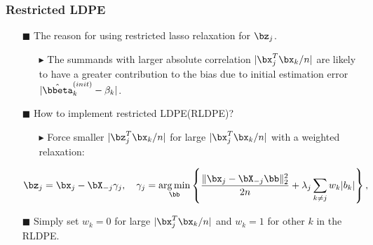 \begin{frame}
\frametitle{Restricted LDPE}
\begin{itemize}
\item[$\blacksquare$] The reason for using restricted lasso relaxation for $\bz_j$.

  \begin{itemize}
  \item[$\blacktriangleright$]The summands with larger absolute correlation $|\bx_j^T\bx_k/n|$ are likely to have a greater contribution to the bias due to initial estimation error $|\hat{\bbeta}^{(init)}_k-\beta_k|$.
  \end{itemize}
\item[$\blacksquare$] How to implement restricted LDPE(RLDPE)?
  \begin{itemize}
  \item[$\blacktriangleright$] Force smaller $|\bz_j^T\bx_k/n|$ for large $|\bx_j^T\bx_k/n|$ with a weighted relaxation:
  \end{itemize}
  \begin{equation}
  \bz_j = \bx_j - \bX_{-j}\gamma_j,\quad \gamma_j = \mathop{\arg\min}_{\bb}\left\{\frac{\|\bx_j-\bX_{-j}\bb\|_2^2}{2n} + \lambda_j\sum_{k\neq j}w_k|b_k|\right\},
  \end{equation}

\item[$\blacksquare$] Simply set $w_k=0$ for large $|\bx_j^T\bx_k/n|$ and $w_k=1$ for other $k$ in the RLDPE.

\end{itemize}
\end{frame}



